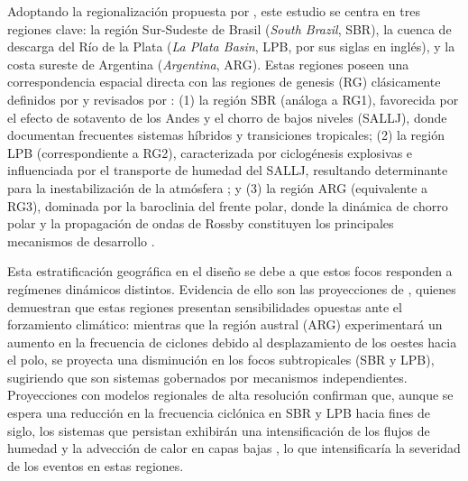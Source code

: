 \label{sec:definicion_regiones}%
Adoptando la regionalización propuesta por \citet{gramcianinov2019properties}, este estudio se centra en tres regiones clave: la región Sur-Sudeste de Brasil (\textit{South Brazil}, SBR), la cuenca de descarga del Río de la Plata (\textit{La Plata Basin}, LPB, por sus siglas en inglés), y la costa sureste de Argentina (\textit{Argentina}, ARG). Estas regiones poseen una correspondencia espacial directa con las regiones de genesis (RG) clásicamente definidos por \citet{reboita2010south} y revisados por \citet{reboita2026meteorology}: (1) la región SBR (análoga a RG1), favorecida por el efecto de sotavento de los Andes y el chorro de bajos niveles (SALLJ), donde \citet{reboita2022from} documentan frecuentes sistemas híbridos y transiciones tropicales; (2) la región LPB (correspondiente a RG2), caracterizada por ciclogénesis explosivas e influenciada por el transporte de humedad del SALLJ, resultando determinante para la inestabilización de la atmósfera \citep{crespo2020potential}; y (3) la región ARG (equivalente a RG3), dominada por la baroclinia del frente polar, donde la dinámica de chorro polar y la propagación de ondas de Rossby constituyen los principales mecanismos de desarrollo \citep{simmonds2000variability}.

Esta estratificación geográfica en el diseño se debe a que estos focos responden a regímenes dinámicos distintos. Evidencia de ello son las proyecciones de \citet{dejesus2021multimodel}, quienes demuestran que estas regiones presentan sensibilidades opuestas ante el forzamiento climático: mientras que la región austral (ARG) experimentará un aumento en la frecuencia de ciclones debido al desplazamiento de los oestes hacia el polo, se proyecta una disminución en los focos subtropicales (SBR y LPB), sugiriendo que son sistemas gobernados por mecanismos independientes. Proyecciones con modelos regionales de alta resolución confirman que, aunque se espera una reducción en la frecuencia ciclónica en SBR y LPB hacia fines de siglo, los sistemas que persistan exhibirán una intensificación de los flujos de humedad y la advección de calor en capas bajas \citep{gramcianinov2024early}, lo que intensificaría la severidad de los eventos en estas regiones.


